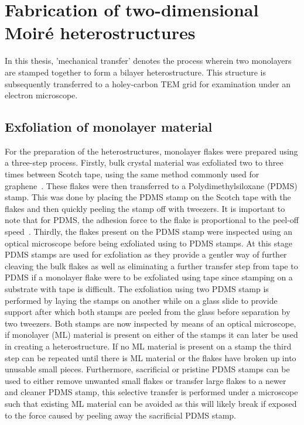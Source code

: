 \section{Fabrication of two-dimensional Moiré heterostructures}
\label{sec:fab_method}
%
In this thesis, 'mechanical transfer' denotes the process wherein two monolayers are stamped together to form a bilayer heterostructure. This structure is subsequently transferred to a holey-carbon TEM grid for examination under an electron microscope.

\subsection{Exfoliation of monolayer material}
%
For the preparation of the heterostructures, monolayer flakes were prepared using a three-step process.
%
Firstly, bulk crystal material was exfoliated two to three times between Scotch tape, using the same method commonly used for graphene~\cite{novoselovRoomTemperatureQuantumHall2007}. 
%
These flakes were then transferred to a Polydimethylsiloxane (PDMS) stamp.
%
This was done by placing the PDMS stamp on the Scotch tape with the flakes and then quickly peeling the stamp off with tweezers. 
%
It is important to note that for PDMS, the adhesion force to the flake is proportional to the peel-off speed~\cite{kusakaMicrocontactPatterningConductive2015}.
%
Thirdly, the flakes present on the PDMS stamp were inspected using an optical microscope before being exfoliated using to PDMS stamps. At this stage PDMS stamps are used for exfoliation as they provide a gentler way of further cleaving the bulk flakes as well as eliminating a further transfer step from tape to PDMS if a monolayer flake were to be exfoliated using tape since stamping on a substrate with tape is difficult. The exfoliation using two PDMS stamp is performed by laying the stamps on another while on a glass slide to provide support after which both stamps are peeled from the glass before separation by two tweezers. Both stamps are now inspected by means of an optical microscope, if monolayer (ML) material is present on either of the stamps it can later be used in creating a heterostructure.
If no ML material is present on a stamp the third step can be repeated until there is ML material or the flakes have broken up into unusable small pieces.
Furthermore, sacrificial or pristine PDMS stamps can be used to either remove unwanted small flakes or transfer large flakes to a newer and cleaner PDMS stamp, this selective transfer is performed under a microscope such that existing ML material can be avoided as this will likely break if exposed to the force caused by peeling away the sacrificial PDMS stamp.

